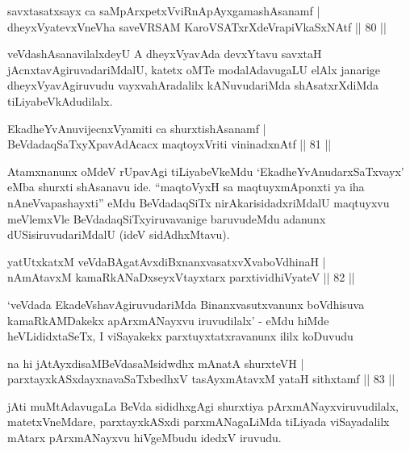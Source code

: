 \begin{shl}
savxtasatxsayx ca saMpArxpetxVviRnA\s pAyxgamashAsanamf  | \\
dheyxVyatevxVneVha saveVRSAM KaroVSATxrXdeVrapiVkaSxNAtf \hfill||  80 ||  
\end{shl}

\begin{artha}
veVdashAsanavilalxdeyU A dheyxVyavAda devxYtavu savxtaH jAcnxtavAgiruvadariMdalU, katetx oMTe modalAdavugaLU elAlx janarige dheyxVyavAgiruvudu vayxvahAradalilx kANuvudariMda shAsatxrXdiMda tiLiyabeVkAdudilalx.
\end{artha}

\begin{shl}
EkadheYvAnuvijecnxVyamiti ca shurxtishAsanamf  | \\
BeVdadaqSaTxyXpavAdAcacx maqtoyxVriti vininadxnAtf \hfill||  81 ||  
\end{shl}

\begin{artha}
Atamxnanunx oMdeV rUpavAgi tiLiyabeVkeMdu `EkadheYvAnudarxSaTxvayx' eMba shurxti shAsanavu ide. ``maqtoVyxH sa maqtuyxmAponxti ya iha nAneVvapashayxti'' eMdu BeVdadaqSiTx nirAkarisidadxriMdalU maqtuyxvu meVlemxVle BeVdadaqSiTxyiruvavanige baruvudeMdu adanunx dUSisiruvudariMdalU (ideV sidAdhxMtavu).
\end{artha}


\begin{shl}
yatUtxkatxM veVdaBAgatAvxdiBxnanxvasatxvXvaboVdhinaH  | \\
nAmAtavxM kamaRkANaDxseyxVtayxtarx parxtividhiVyateV \hfill||  82 ||  
\end{shl}

\begin{artha}
`veVdada EkadeVshavAgiruvudariMda Binanxvasutxvanunx boVdhisuva kamaRkAMDakekx apArxmANayxvu iruvudilalx' - eMdu hiMde heVLididxtaSeTx, I viSayakekx parxtuyxtatxravanunx ililx koDuvudu \mdash 
\end{artha}

\begin{shl}
na hi jAtAyxdisaMBeVdasaMsidwdhx mAnatA shurxteVH  | \\
parxtayxkASxdayxnavaSaTxbedhxV tasAyxmAtavxM yataH sithxtamf \hfill||  83 ||  
\end{shl}

\begin{artha}
jAti muMtAdavugaLa BeVda sididhxgAgi shurxtiya pArxmANayxviruvudilalx, matetxVneMdare, parxtayxkASxdi parxmANagaLiMda tiLiyada viSayadalilx mAtarx pArxmANayxvu hiVgeMbudu idedxV iruvudu.
\end{artha}

